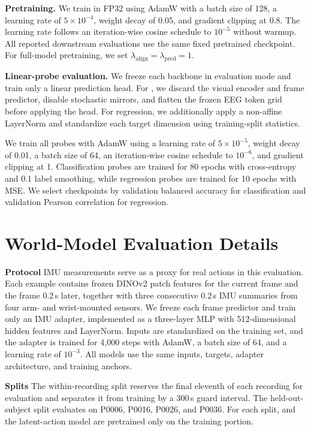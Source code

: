 \noindent\textbf{Pretraining.}
We train \mwm{} in FP32 using AdamW with a batch size of 128, a learning rate of $5\times10^{-4}$, weight decay of 0.05, and gradient clipping at 0.8. The learning rate follows an iteration-wise cosine schedule to $10^{-5}$ without warmup. All reported downstream \mwm{} evaluations use the same fixed pretrained checkpoint. For full-model pretraining, we set $\lambda_{\mathrm{align}}=\lambda_{\mathrm{pred}}=1$.

\noindent\textbf{Linear-probe evaluation.}
We freeze each backbone in evaluation mode and train only a linear prediction head. For \mwm{}, we discard the visual encoder and frame predictor, disable stochastic mirrors, and flatten the frozen EEG token grid before applying the head. For regression, we additionally apply a non-affine LayerNorm and standardize each target dimension using training-split statistics.

We train all probes with AdamW using a learning rate of $5\times10^{-5}$, weight decay of 0.01, a batch size of 64, an iteration-wise cosine schedule to $10^{-6}$, and gradient clipping at 1. Classification probes are trained for 80 epochs with cross-entropy and 0.1 label smoothing, while regression probes are trained for 10 epochs with MSE. We select checkpoints by validation balanced accuracy for classification and validation Pearson correlation for regression.

\section{World-Model Evaluation Details}
\label{app:mwm-world-model-probe}

\noindent\textbf{Protocol}
IMU measurements serve as a proxy for real actions in this evaluation. Each example contains frozen DINOv2 patch features for the current frame and the frame $0.2$\,s later, together with three consecutive $0.2$\,s IMU summaries from four arm- and wrist-mounted sensors. We freeze each frame predictor and train only an IMU adapter, implemented as a three-layer MLP with 512-dimensional hidden features and LayerNorm. Inputs are standardized on the training set, and the adapter is trained for 4,000 steps with AdamW, a batch size of 64, and a learning rate of $10^{-3}$. All models use the same inputs, targets, adapter architecture, and training anchors.

\noindent\textbf{Splits}
The within-recording split reserves the final eleventh of each recording for evaluation and separates it from training by a $300$\,s guard interval. The held-out-subject split evaluates on P0006, P0016, P0026, and P0036. For each split, \mwm{} and the latent-action model are pretrained only on the training portion.

